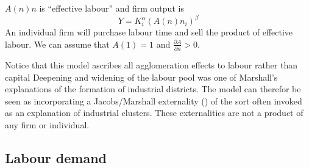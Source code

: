   $A(n)n$ is  ``effective labour'' and 
firm output is 
\begin{equation} 
Y=K_i^{\alpha }(A(n)n_i)^{\beta }
\label{eqn-solow-swan2}
\end{equation}
An individual firm will purchase labour time  and sell the product of effective labour. %
We can assume  that $A(1)=1$ and $\frac{\partial A}{\partial n}>0$. 

Notice that this model ascribes all agglomeration effects to labour rather than capital Deepening  and widening of the labour pool was one of Marshall's explanations of the formation of industrial districts. The model can therefor  be seen as incorporating a Jacobs/Marshall externality (\cite{beaudryWhoRightMarshall2009, vanderpanneAgglomerationExternalitiesMarshall2004}) of the sort often invoked as an explanation of industrial clusters. These externalities  are not a product of any firm or individual. 



\subsection{Labour demand}\label{sec-labour-demand}


